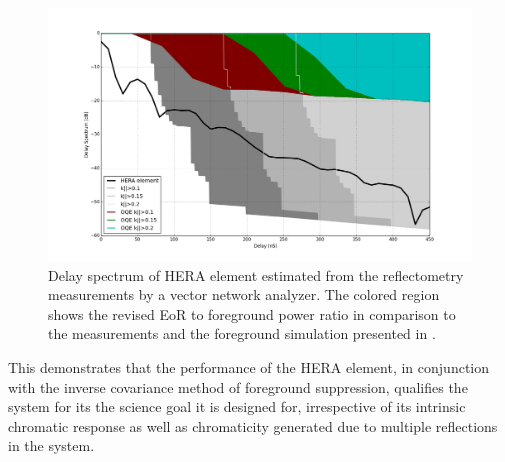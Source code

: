 \documentclass[twocolumn]{emulateapj}
\begin{document}
    \begin{figure}
    \centering
    \includegraphics[width=\linewidth]{GB_reflectometry_part3/plot/HERA_ds_fg_sim_rev.png}
    \caption{Delay spectrum of HERA element estimated from the reflectometry measurements by a vector network analyzer. The colored region shows the revised EoR to foreground power ratio in comparison to the measurements and the foreground simulation presented in \cite{Thyagarajan_et_al2016}.}
    \label{fig:sim_fg_revised}
    \end{figure}
    This demonstrates that the performance of the HERA element, in conjunction with the inverse covariance method of foreground suppression, qualifies the system for its the science goal it is designed for, irrespective of its intrinsic chromatic response as well as chromaticity generated due to multiple reflections in the system.
    
\end{document}
